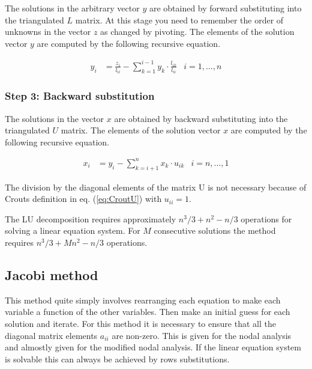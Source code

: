 \documentclass[10pt]{report}
\begin{document}
The solutions in the arbitrary vector $y$ are obtained by forward
substituting into the triangulated $L$ matrix.  At this stage you need
to remember the order of unknowns in the vector $z$ as changed by
pivoting.  The elements of the solution vector $y$ are computed by the
following recursive equation.

\begin{align}
y_{i} &= \frac{z_{i}}{l_{ii}} - \sum_{k=1}^{i-1} y_{k}\cdot \frac{l_{ik}}{l_{ii}} & i = 1,\ldots,n
\end{align}

\subsubsection{Step 3: Backward substitution}

The solutions in the vector $x$ are obtained by backward substituting
into the triangulated $U$ matrix.  The elements of the solution vector
$x$ are computed by the following recursive equation.

\begin{align}
x_{i} &= y_{i} - \sum_{k=i+1}^{n} x_{k}\cdot u_{ik} & i = n,\ldots,1
\end{align}

The division by the diagonal elements of the matrix U is not necessary
because of Crouts definition in eq. (\ref{eq:CroutU}) with $u_{ii} =
1$.

\addvspace{12pt}

The LU decomposition requires approximately $n^3/3 + n^2 - n/3$
operations for solving a linear equation system.  For $M$ consecutive
solutions the method requires $n^3/3 + Mn^2 - n/3$ operations.

\subsection{Jacobi method}

This method quite simply involves rearranging each equation to make
each variable a function of the other variables.  Then make an initial
guess for each solution and iterate.  For this method it is necessary
to ensure that all the diagonal matrix elements $a_{ii}$ are non-zero.
This is given for the nodal analysis and almostly given for the
modified nodal analysis.  If the linear equation system is solvable
this can always be achieved by rows substitutions.
\end{document}
